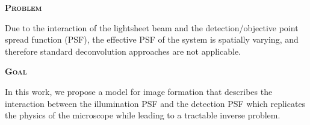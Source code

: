 \documentclass[a0paper,portrait,fontscale=0.35]{baposter}
\theoremstyle{plain}
\theoremstyle{plain}
\theoremstyle{definition}
\theoremstyle{plain}
\theoremstyle{definition}
\begin{document}
\begin{poster}
{  \begin{minipage}[t]{0.48\textwidth}
    \begin{center}
      \larger
      {\color{red}\textbf{\textsc{Problem}}}\\
    \end{center}
    \vspace{-1em}
    \begin{tcolorbox}[colback=red!10!white,colframe=red]
      Due to the interaction of the lightsheet beam  
      and the detection/objective point spread function (PSF), 
      the effective PSF of the system is spatially varying, and
      therefore standard deconvolution approaches are not applicable.
    \end{tcolorbox}
  \end{minipage}
  \hspace{0.6em}
  \begin{minipage}[t]{0.48\textwidth}
    \begin{center}
      \larger
      {\color{blue}\textbf{\textsc{Goal}}}\\
    \end{center}
    \vspace{-1em}
    \begin{tcolorbox}[colback=blue!10!white,colframe=blue]
      In this work, we propose a model for image formation 
      that describes the interaction between the 
      illumination PSF and the detection PSF which 
      replicates the physics of the microscope while 
      leading to a tractable inverse problem.
    \end{tcolorbox}
  \end{minipage}
  \vspace{-1em}
}
\end{poster}
\end{document}
